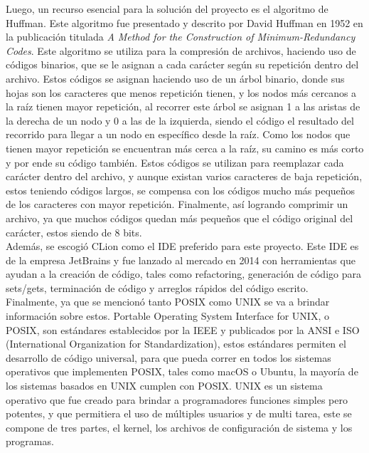 \documentclass[12pt, article, natbib]{IEEEtran}
\begin{document}
Luego, un recurso esencial para la solución del proyecto es el algoritmo de Huffman. Este algoritmo fue presentado y descrito por David Huffman en 1952 en la publicación titulada \textit{A Method for the Construction of Minimum-Redundancy Codes}. Este algoritmo se utiliza para la compresión de archivos, haciendo uso de códigos binarios, que se le asignan a cada carácter según su repetición dentro del archivo. Estos códigos se asignan haciendo uso de un árbol binario, donde sus hojas son los caracteres que menos repetición tienen, y los nodos más cercanos a la raíz tienen mayor repetición, al recorrer este árbol se asignan 1 a las aristas de la derecha de un nodo y 0 a las de la izquierda, siendo el código el resultado del recorrido para llegar a un nodo en específico desde la raíz. Como los nodos que tienen mayor repetición se encuentran más cerca a la raíz, su camino es más corto y por ende su código también. Estos códigos se utilizan para reemplazar cada carácter dentro del archivo, y aunque existan varios caracteres de baja repetición, estos teniendo códigos largos, se compensa con los códigos mucho más pequeños de los caracteres con mayor repetición. Finalmente, así logrando comprimir un archivo, ya que muchos códigos quedan más pequeños que el código original del carácter, estos siendo de 8 bits.\cite{lpezfernndez_2010_algoritmo}\cite{techiedelight_2017_algoritmo}\\

Además, se escogió CLion como el IDE preferido para este proyecto. Este IDE es de la empresa JetBrains y fue lanzado al mercado en 2014\cite{avram_2014_jetbrains} con herramientas que ayudan a la creación de código, tales como refactoring, generación de código para sets/gets, terminación de código y arreglos rápidos del código escrito.\cite{jetbrains_intelligent}\\

Finalmente, ya que se mencionó tanto POSIX como UNIX se va a brindar información sobre estos. Portable Operating System Interface for UNIX, o POSIX, son estándares establecidos por la IEEE y publicados por la ANSI e ISO (International Organization for Standardization), estos estándares permiten el desarrollo de código universal, para que pueda correr en todos los sistemas operativos que implementen POSIX, tales como macOS o Ubuntu, la mayoría de los sistemas basados en UNIX cumplen con POSIX.\cite{universityinformationtechnologyservices_2021_about} UNIX es un sistema operativo que fue creado para brindar a programadores funciones simples pero potentes, y que permitiera el uso de múltiples usuarios y de multi tarea, este se compone de tres partes, el kernel, los archivos de configuración de sistema y los programas.\cite{idahostateuniversity_1997_what}
\end{document}
